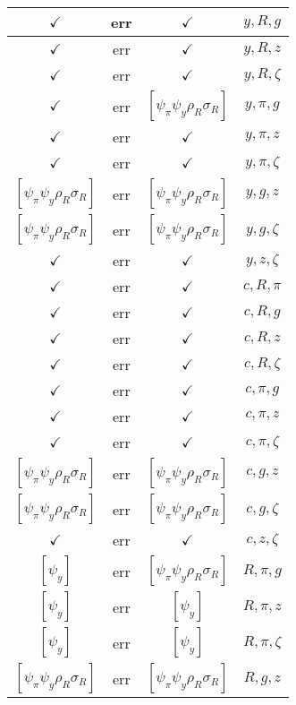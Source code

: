 \documentclass[a4paper,10pt]{article}
\begin{document}
\begin{longtable}{|c|c|c|c|}
\hline
$\checkmark$ & err & $\checkmark$ & ${y},{R},{g}$ \\
\hline
$\checkmark$ & err & $\checkmark$ & ${y},{R},{z}$ \\
\hline
$\checkmark$ & err & $\checkmark$ & ${y},{R},{\zeta}$ \\
\hline
$\checkmark$ & err & $[\psi_\pi \psi_y \rho_R \sigma_R ]$ & ${y},{\pi},{g}$ \\
\hline
$\checkmark$ & err & $\checkmark$ & ${y},{\pi},{z}$ \\
\hline
$\checkmark$ & err & $\checkmark$ & ${y},{\pi},{\zeta}$ \\
\hline
$[\psi_\pi \psi_y \rho_R \sigma_R ]$ & err & $[\psi_\pi \psi_y \rho_R \sigma_R ]$ & ${y},{g},{z}$ \\
\hline
$[\psi_\pi \psi_y \rho_R \sigma_R ]$ & err & $[\psi_\pi \psi_y \rho_R \sigma_R ]$ & ${y},{g},{\zeta}$ \\
\hline
$\checkmark$ & err & $\checkmark$ & ${y},{z},{\zeta}$ \\
\hline
$\checkmark$ & err & $\checkmark$ & ${c},{R},{\pi}$ \\
\hline
$\checkmark$ & err & $\checkmark$ & ${c},{R},{g}$ \\
\hline
$\checkmark$ & err & $\checkmark$ & ${c},{R},{z}$ \\
\hline
$\checkmark$ & err & $\checkmark$ & ${c},{R},{\zeta}$ \\
\hline
$\checkmark$ & err & $\checkmark$ & ${c},{\pi},{g}$ \\
\hline
$\checkmark$ & err & $\checkmark$ & ${c},{\pi},{z}$ \\
\hline
$\checkmark$ & err & $\checkmark$ & ${c},{\pi},{\zeta}$ \\
\hline
$[\psi_\pi \psi_y \rho_R \sigma_R ]$ & err & $[\psi_\pi \psi_y \rho_R \sigma_R ]$ & ${c},{g},{z}$ \\
\hline
$[\psi_\pi \psi_y \rho_R \sigma_R ]$ & err & $[\psi_\pi \psi_y \rho_R \sigma_R ]$ & ${c},{g},{\zeta}$ \\
\hline
$\checkmark$ & err & $\checkmark$ & ${c},{z},{\zeta}$ \\
\hline
$[\psi_y ]$ & err & $[\psi_\pi \psi_y \rho_R \sigma_R ]$ & ${R},{\pi},{g}$ \\
\hline
$[\psi_y ]$ & err & $[\psi_y ]$ & ${R},{\pi},{z}$ \\
\hline
$[\psi_y ]$ & err & $[\psi_y ]$ & ${R},{\pi},{\zeta}$ \\
\hline
$[\psi_\pi \psi_y \rho_R \sigma_R ]$ & err & $[\psi_\pi \psi_y \rho_R \sigma_R ]$ & ${R},{g},{z}$ \\

\end{longtable}
\end{document}
